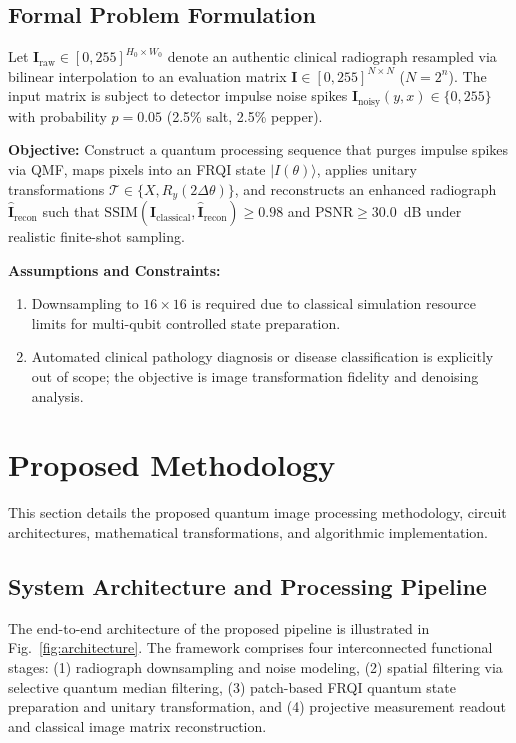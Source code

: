 \documentclass[12pt,onecolumn,draftclsnofoot]{IEEEtran}
\begin{document}
\subsection{Formal Problem Formulation}
Let $\mathbf{I}_{\text{raw}} \in [0, 255]^{H_0 \times W_0}$ denote an authentic clinical radiograph resampled via bilinear interpolation to an evaluation matrix $\mathbf{I} \in [0, 255]^{N \times N}$ ($N = 2^n$). The input matrix is subject to detector impulse noise spikes $\mathbf{I}_{\text{noisy}}(y, x) \in \{0, 255\}$ with probability $p = 0.05$ (2.5\% salt, 2.5\% pepper).

\textbf{Objective:} Construct a quantum processing sequence that purges impulse spikes via QMF, maps pixels into an FRQI state $|I(\theta)\rangle$, applies unitary transformations $\mathcal{T} \in \{X, R_y(2\Delta\theta)\}$, and reconstructs an enhanced radiograph $\hat{\mathbf{I}}_{\text{recon}}$ such that $\text{SSIM}(\mathbf{I}_{\text{classical}}, \hat{\mathbf{I}}_{\text{recon}}) \ge 0.98$ and $\text{PSNR} \ge 30.0$~dB under realistic finite-shot sampling.

\textbf{Assumptions and Constraints:}
\begin{enumerate}
    \item Downsampling to $16\times16$ is required due to classical simulation resource limits for multi-qubit controlled state preparation.
    \item Automated clinical pathology diagnosis or disease classification is explicitly out of scope; the objective is image transformation fidelity and denoising analysis.
\end{enumerate}

\section{Proposed Methodology}
This section details the proposed quantum image processing methodology, circuit architectures, mathematical transformations, and algorithmic implementation.

\subsection{System Architecture and Processing Pipeline}
The end-to-end architecture of the proposed pipeline is illustrated in Fig.~\ref{fig:architecture}. The framework comprises four interconnected functional stages: (1) radiograph downsampling and noise modeling, (2) spatial filtering via selective quantum median filtering, (3) patch-based FRQI quantum state preparation and unitary transformation, and (4) projective measurement readout and classical image matrix reconstruction.
\end{document}
